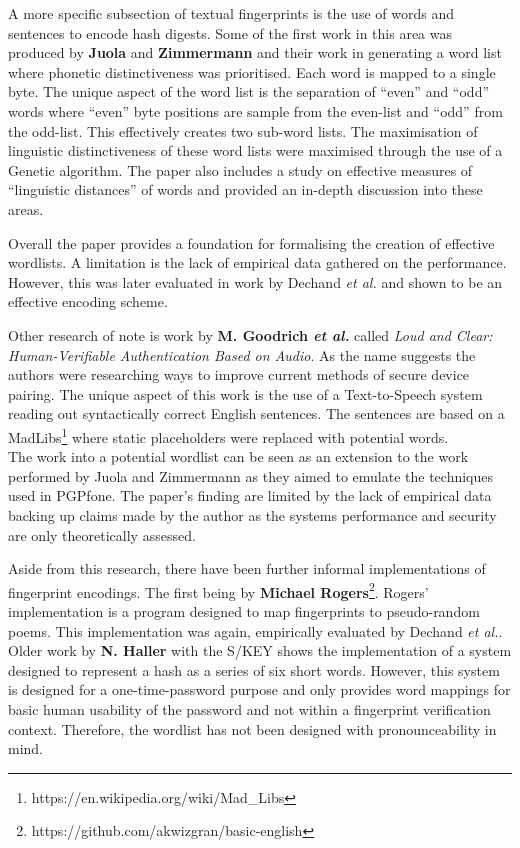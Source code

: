 A more specific subsection of textual fingerprints is the use of words and sentences to encode hash digests. Some of the first work in this area was produced by \textbf{Juola} and \textbf{Zimmermann}
\cite{juola1996whole} and their work in generating a word list where phonetic distinctiveness was prioritised. Each word is mapped to a single byte. The unique aspect of the word list is the separation of ``even'' and ``odd'' words where ``even'' byte positions are sample from the even-list and ``odd'' from the odd-list. This effectively creates two sub-word lists. The maximisation of linguistic distinctiveness of these word lists were maximised through the use of a Genetic algorithm. The paper also includes a study on effective measures of ``linguistic distances'' of words and provided an in-depth discussion into these areas.

Overall the paper provides a foundation for formalising the creation of effective wordlists. A limitation is the lack of empirical data gathered on the performance. However, this was later evaluated in work by Dechand \textit{et al.} \cite{dechand2016empirical} and shown to be an effective encoding scheme.

Other research of note is work by \textbf{M. Goodrich \textit{et al.}}\cite{goodrich2006loud} called \textit{Loud and Clear: Human-Verifiable Authentication Based on Audio}. As the name suggests the authors were researching ways to improve current methods of secure device pairing. The unique aspect of this work is the use of a Text-to-Speech system reading out syntactically correct English sentences. The sentences are based on a MadLibs\footnote{https://en.wikipedia.org/wiki/Mad\_Libs} where static placeholders were replaced with potential words.\\
The work into a potential wordlist can be seen as an extension to the work performed by Juola and Zimmermann\cite{juola1996whole} as they aimed to emulate the techniques used in PGPfone. The paper's finding are limited by the lack of empirical data backing up claims made by the author as the systems performance and security are only theoretically assessed.

Aside from this research, there have been further informal implementations of fingerprint encodings. The first being by \textbf{Michael Rogers}\footnote{https://github.com/akwizgran/basic-english}. Rogers' implementation is a program designed to map fingerprints to pseudo-random poems. This implementation was again, empirically evaluated by Dechand \textit{et al.}\cite{dechand2016empirical}. Older work by \textbf{N. Haller} with the S/KEY\cite{haller1995s} shows the implementation of a system designed to represent a hash as a series of six short words. However, this system is designed for a one-time-password purpose and only provides word mappings for basic human usability of the password and not within a fingerprint verification context. Therefore, the wordlist has not been designed with pronounceability in mind.

